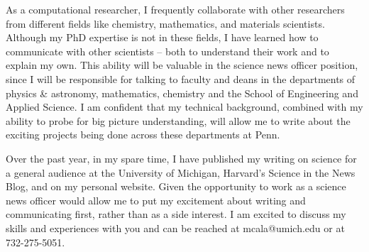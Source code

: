 As a computational researcher, I frequently collaborate with other researchers from different fields like chemistry, mathematics, and materials scientists. Although my PhD expertise is not in these fields, I have learned how to communicate with other scientists -- both to understand their work and to explain my own. This ability will be valuable in the science news officer position, since I will be responsible for talking to faculty and deans in the departments of physics \& astronomy, mathematics, chemistry and the School of Engineering and Applied Science. I am confident that my technical background, combined with my ability to probe for big picture understanding, will allow me to write about the exciting projects being done across these departments at Penn.

Over the past year, in my spare time, I have published my writing on science for a general audience at the University of Michigan, Harvard’s Science in the News Blog, and on my personal website. Given the opportunity to work as a science news officer would allow me to put my excitement about writing and communicating first, rather than as a side interest. I am excited to discuss my skills and experiences with you and can be reached at mcala@umich.edu or at 732-275-5051.

\makeletterclosing
